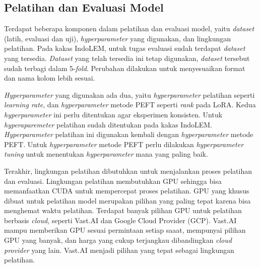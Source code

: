 \subsection{Pelatihan dan Evaluasi Model}

Terdapat beberapa komponen dalam pelatihan dan evaluasi model, yaitu \textit{dataset} (latih, evaluasi dan uji), \textit{hyperparameter} yang digunakan, dan lingkungan pelatihan. Pada kakas IndoLEM, untuk tugas evaluasi \nlptask sudah terdapat \textit{dataset} yang tersedia. \textit{Dataset} yang telah tersedia ini tetap digunakan, \textit{dataset} tersebut sudah terbagi dalam 5-\textit{fold}. Perubahan dilakukan untuk menyesuaikan format dan nama kolom  lebih sesuai.

\textit{Hyperparameter} yang digunakan ada dua, yaitu \textit{hyperparameter} pelatihan seperti \textit{learning rate}, dan \textit{hyperparameter} metode PEFT seperti \textit{rank} pada LoRA. Kedua \textit{hyperparameter} ini perlu ditentukan agar eksperimen konsisten. Untuk \textit{hyperaparemeter} pelatihan sudah ditentukan pada kakas IndoLEM. \textit{Hyperparameter} pelatihan ini digunakan kembali dengan \textit{hyperparameter} metode PEFT. Untuk \textit{hyperparameter} metode PEFT perlu dilakukan \textit{hyperparameter tuning} untuk menentukan \textit{hyperparameter} mana yang paling baik.

Terakhir, lingkungan pelatihan dibutuhkan untuk menjalankan proses pelatihan dan evaluasi. Lingkungan pelatihan membutuhkan GPU sehingga bisa memanfaatkan CUDA untuk mempercepat proses pelatihan. GPU yang khusus dibuat untuk pelatihan model merupakan pilihan yang paling tepat karena bisa menghemat waktu pelatihan. Terdapat banyak pilihan GPU untuk pelatihan berbasis \textit{cloud}, seperti Vast.AI dan Google Cloud Provider (GCP). Vast.AI mampu memberikan GPU sesuai permintaan setiap saaat, mempunyai pilihan GPU yang banyak, dan harga yang cukup terjangkau dibandingkan \textit{cloud provider} yang lain. Vast.AI menjadi pilihan yang tepat sebagai lingkungan pelatihan.

